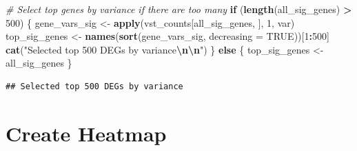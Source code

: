 \documentclass[
]{article}
\newenvironment{Shaded}{\begin{snugshade}}{\end{snugshade}}
\newcommand{\AttributeTok}[1]{\textcolor[rgb]{0.13,0.29,0.53}{#1}}
\newcommand{\CommentTok}[1]{\textcolor[rgb]{0.56,0.35,0.01}{\textit{#1}}}
\newcommand{\ConstantTok}[1]{\textcolor[rgb]{0.56,0.35,0.01}{#1}}
\newcommand{\ControlFlowTok}[1]{\textcolor[rgb]{0.13,0.29,0.53}{\textbf{#1}}}
\newcommand{\DecValTok}[1]{\textcolor[rgb]{0.00,0.00,0.81}{#1}}
\newcommand{\FunctionTok}[1]{\textcolor[rgb]{0.13,0.29,0.53}{\textbf{#1}}}
\newcommand{\NormalTok}[1]{#1}
\newcommand{\OtherTok}[1]{\textcolor[rgb]{0.56,0.35,0.01}{#1}}
\newcommand{\SpecialCharTok}[1]{\textcolor[rgb]{0.81,0.36,0.00}{\textbf{#1}}}
\newcommand{\StringTok}[1]{\textcolor[rgb]{0.31,0.60,0.02}{#1}}
\begin{document}
\begin{Shaded}
\begin{Highlighting}[]
\CommentTok{\# Select top genes by variance if there are too many}
\ControlFlowTok{if}\NormalTok{ (}\FunctionTok{length}\NormalTok{(all\_sig\_genes) }\SpecialCharTok{\textgreater{}} \DecValTok{500}\NormalTok{) \{}
\NormalTok{  gene\_vars\_sig }\OtherTok{\textless{}{-}} \FunctionTok{apply}\NormalTok{(vst\_counts[all\_sig\_genes, ], }\DecValTok{1}\NormalTok{, var)}
\NormalTok{  top\_sig\_genes }\OtherTok{\textless{}{-}} \FunctionTok{names}\NormalTok{(}\FunctionTok{sort}\NormalTok{(gene\_vars\_sig, }\AttributeTok{decreasing =} \ConstantTok{TRUE}\NormalTok{))[}\DecValTok{1}\SpecialCharTok{:}\DecValTok{500}\NormalTok{]}
  \FunctionTok{cat}\NormalTok{(}\StringTok{"Selected top 500 DEGs by variance}\SpecialCharTok{\textbackslash{}n\textbackslash{}n}\StringTok{"}\NormalTok{)}
\NormalTok{\} }\ControlFlowTok{else}\NormalTok{ \{}
\NormalTok{  top\_sig\_genes }\OtherTok{\textless{}{-}}\NormalTok{ all\_sig\_genes}
\NormalTok{\}}
\end{Highlighting}
\end{Shaded}

\begin{verbatim}
## Selected top 500 DEGs by variance
\end{verbatim}

\section{Create Heatmap}\label{create-heatmap}
\end{document}
